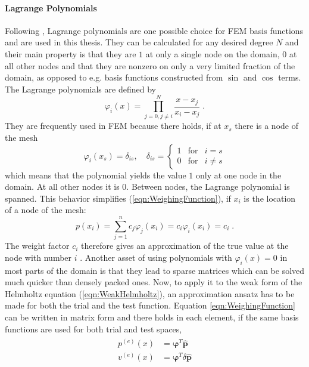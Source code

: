\documentclass[%
  a4paper,oneside,%
  11pt,%
  smallchapters,
  style=printdev,
  extramargin,
  green,%
  rgb, <cmyk>
  ]{tubsbook}
\begin{document}
\paragraph{Lagrange Polynomials}
Following \cite{langtangen2019}, Lagrange polynomials are one possible choice for FEM basis functions and are used in this thesis. They can be calculated for any desired degree $N$ and their main property is that they are $1$ at only a single node on the domain, $0$ at all other nodes and that they are nonzero on only a very limited fraction of the domain, as opposed to e.g. basis functions constructed from $\sin$ and $\cos$ terms. The Lagrange polynomials are defined by
\begin{equation}
\varphi_i(x) = \prod_{j=0,j\neq i}^N \frac{x-x_j}{x_i-x_j} \;.
\end{equation}
They are frequently used in FEM because there holds, if at $x_s$ there is a node of the mesh 
\begin{equation}
\varphi_i(x_s) = \delta_{is}, \quad \delta_{is}  =     \left\{ \begin{array}{rcl} 1 & \mbox{for}& i = s  \\ 0 & \mbox{for} & i \neq s\end{array}\right .
\end{equation}
which means that the polynomial yields the value $1$ only at one node in the domain. At all other nodes it is $0$. Between nodes, the Lagrange polynomial is spanned. This behavior simplifies (\ref{eqn:WeighingFunction}), if $x_i$ is the location of a node of the mesh:
\begin{equation}
p(x_i) = \sum_{j = 1}^n c_j  \varphi_j(x_i) = c_i \varphi_i(x_i) = c_i \;.
\end{equation}
The weight factor $c_i$ therefore gives an approximation of the true value at the node with number $i$ \cite[pp. 78, 79]{langtangen2019}. 
Another asset of using polynomials with $\varphi_i(x) = 0$ in most parts of the domain is that they lead to sparse matrices which can be solved much quicker than densely packed ones.
%
Now, to apply it to the weak form of the Helmholtz equation (\ref{eqn:WeakHelmholtz}), an approximation ansatz has to be made for both the trial and the test function. Equation \eqref{eqn:WeighingFunction} can be written in matrix form and there holds in each element, if the same basis functions are used for both trial and test spaces,
\begin{align}
\begin{split}
p^{(e)}(x) &= \bm{\varphi}^T \hat{\bm{p}} \\
v^{(e)}(x) &= \bm{\varphi}^T \delta\hat{\bm{p}}
\end{split}
\label{eqn:FEMAnsatz}
\end{align}
\end{document}
